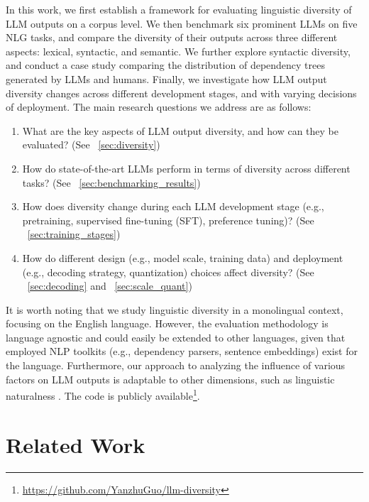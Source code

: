 \documentclass[11pt,a4paper]{article}
\begin{document}

In this work, we first establish a framework for evaluating linguistic diversity of LLM outputs on a corpus level. We then benchmark six prominent LLMs on five NLG tasks, and compare the diversity of their outputs across three different aspects: lexical, syntactic, and semantic. We further explore syntactic diversity, and conduct a case study comparing the distribution of dependency trees generated by LLMs and humans. Finally, we investigate how LLM output diversity changes across different development stages, and with varying decisions of deployment.
The main research questions we address are as follows:	
\begin{enumerate}[noitemsep,topsep=0pt,parsep=0pt,partopsep=0pt,leftmargin=*]
    \item What are the key aspects of LLM output diversity, and how can they be evaluated? (See \textsection~\ref{sec:diversity})
    \item How do state-of-the-art LLMs perform in terms of diversity across different tasks? (See \textsection~\ref{sec:benchmarking_results})
    \item How does diversity change during each LLM development stage (e.g., pretraining, supervised fine-tuning (SFT), preference tuning)? (See \textsection~\ref{sec:training_stages})
    \item How do different design (e.g., model scale, training data) and deployment (e.g., decoding strategy, quantization) choices affect diversity?	(See \textsection~\ref{sec:decoding} and \textsection~\ref{sec:scale_quant})
\end{enumerate}

\noindent It is worth noting that we study linguistic diversity in a monolingual context, focusing on the English language. However, the evaluation methodology is language agnostic and could easily be extended to other languages, given that employed NLP toolkits (e.g., dependency parsers, sentence embeddings) exist for the language. Furthermore, our approach to analyzing the influence of various factors on LLM outputs is adaptable to other dimensions, such as linguistic naturalness \citep{guo2024large}.
The code is publicly available\footnote{\tiny\url{https://github.com/YanzhuGuo/llm-diversity}}.


\section{Related Work}
	
\end{document}
